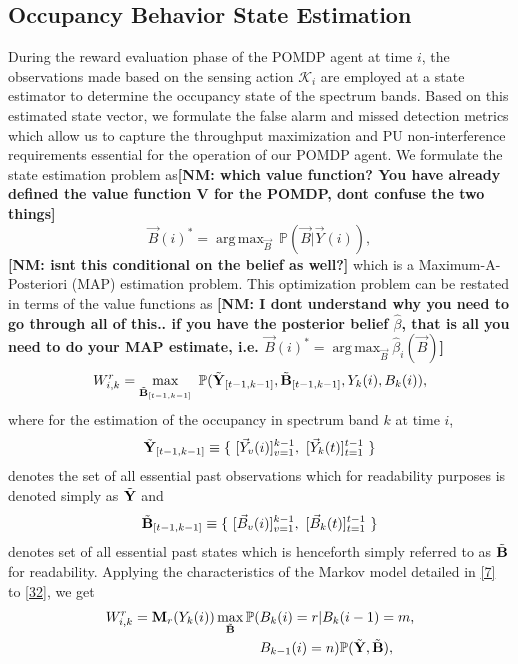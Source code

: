 \documentclass[10pt,twocolumn]{IEEEtran}
\newcommand{\nm}[1]{{\color{blue}\bf{[NM: #1]}}}
\DeclareMathOperator*{\argmax}{arg\,max}
\begin{document}
\subsection{Occupancy Behavior State Estimation}
During the reward evaluation phase of the POMDP agent at time $i$, the observations made based on the sensing action $\mathcal{K}_i$ are employed at a state estimator to determine the occupancy state of the spectrum bands. Based on this estimated state vector, we formulate the false alarm and missed detection metrics which allow us to capture the throughput maximization and PU non-interference requirements essential for the operation of our POMDP agent. We formulate the state estimation problem as\nm{which value function? You have already defined the value function V for the POMDP, dont confuse the two things}
\begin{equation}\label{31}
    \vec{B}(i)^* = \argmax_{\vec{B}}\ \mathbb{P}(\vec{B}|\vec{Y}(i)),
\end{equation}
\nm{isnt this conditional on the belief as well?}
which is a Maximum-A-Posteriori (MAP) estimation problem. This optimization problem can be restated in terms of the value functions as
\nm{I dont understand why you need to go through all of this.. if you have the posterior belief $\hat \beta$, that is all you need to do your MAP estimate, i.e. $ \vec{B}(i)^* = \argmax_{\vec{B}}\hat\beta_i(\vec{B})$}
\begin{equation}\label{32}
    W_{i,k}^{r} = \max_{\Tilde{\mathbf{B}}_{[t-1,k-1]}}\ \mathbb{P}(\Tilde{\mathbf{Y}}_{[t-1,k-1]},\Tilde{\mathbf{B}}_{[t-1,k-1]},Y_k(i),B_k(i)),
\end{equation}
where for the estimation of the occupancy in spectrum band $k$ at time $i$, 
\begin{equation}\label{33}
    \Tilde{\mathbf{Y}}_{[t-1,k-1]} \equiv \{\ [\vec{Y}_v(i)]_{v=1}^{k-1},\ [\vec{Y}_k(t)]_{t=1}^{t-1}\ \}
\end{equation}
denotes the set of all essential past observations which for readability purposes is denoted simply as $\Tilde{\mathbf{Y}}$ and
\begin{equation}\label{34}
    \Tilde{\mathbf{B}}_{[t-1,k-1]} \equiv \{\ [\vec{B}_v(i)]_{v=1}^{k-1},\ [\vec{B}_k(t)]_{t=1}^{t-1}\ \}
\end{equation}
denotes set of all essential past states which is henceforth simply referred to as $\Tilde{\textbf{B}}$ for readability. Applying the characteristics of the Markov model detailed in \eqref{7} to \eqref{32}, we get
\begin{equation}\label{35}
    \begin{aligned}
        W_{i,k}^{r} = \mathbf{M}_r(Y_k(i))\max_{\Tilde{\mathbf{B}}}\mathbb{P}(&B_k(i)=r|B_{k}(i-1)=m,\\
        &B_{k-1}(i)=n)\mathbb{P}(\Tilde{\mathbf{Y}},\Tilde{\mathbf{B}}),
    \end{aligned}
\end{equation}
\end{document}
